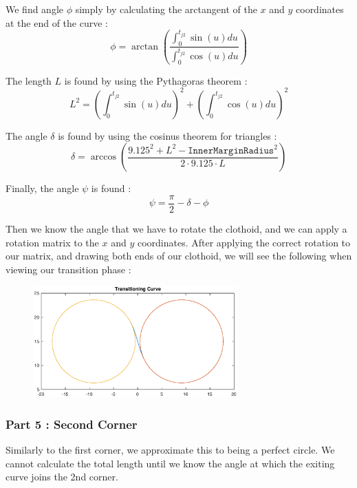 \documentclass[a4paper, 11pt]{article}
\begin{document}
We find angle $\phi$ simply by calculating the arctangent of the $x$ and $y$ coordinates at the end of the curve :
\begin{equation}
	\phi = \arctan\left(\frac{\int_0^{t_{j2}} \sin(u)du}{\int_0^{t_{j2}} \cos(u)du} \right)
\end{equation}

The length $L$ is found by using the Pythagoras theorem :
\begin{equation}
	L^2 = \left(\int_0^{t_{j2}} \sin(u)du \right)^2 + \left(\int_0^{t_{j2}} \cos(u)du \right)^2
\end{equation}

The angle $\delta$ is found by using the cosinus theorem for triangles :
\begin{equation}
	\delta = \arccos\left(\frac{9.125^2 + L^2 - \texttt{InnerMarginRadius}^2}{2\cdot 9.125\cdot L} \right)
\end{equation}

Finally, the angle $\psi$ is found :
\begin{equation}
	\psi = \frac{\pi}{2} - \delta - \phi
\end{equation}

Then we know the angle that we have to rotate the clothoid, and we can apply a rotation matrix to the $x$ and $y$ coordinates. After applying the correct rotation to our matrix, and drawing both ends of our clothoid, we will see the following when viewing our transition phase :
\begin{figure}[H]
	\centering
	\includegraphics[trim = 1.5cm 3cm 1cm 2.5cm, clip, width = 0.7\textwidth]{Figures/TransitionCurve.eps}
	\caption{ }
\end{figure}

\subsubsection{Part 5 : Second Corner}

Similarly to the first corner, we approximate this to being a perfect circle. We cannot calculate the total length until we know the angle at which the exiting curve joins the 2nd corner.\\
\end{document}
